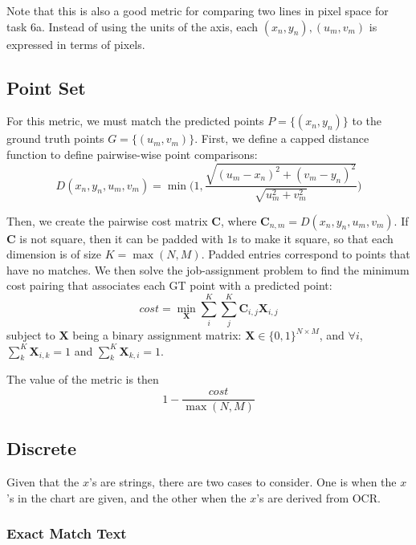 \documentclass[a4paper,11pt]{scrartcl}
\begin{document}
Note that this is also a good metric for comparing two lines in pixel space for task 6a.
Instead of using the units of the axis, each $(x_n, y_n), (u_m, v_m)$ is expressed in terms of pixels.

\subsection{Point Set}

For this metric, we must match the predicted points $P = \{(x_n,y_n)\}$ to the ground truth points $G = \{(u_m, v_m)\}$.
First, we define a capped distance function to define pairwise-wise point comparisons:
\begin{equation}
D(x_n, y_n, u_m, v_m) = \min \Big(1, \frac{\sqrt{(u_m - x_n)^2 + (v_m - y_n)^2}}{\sqrt{u_m^2 + v_m^2}} \Big)
\end{equation}

Then, we create the pairwise cost matrix $\mathbf{C}$, where $\mathbf{C}_{n,m} = D(x_n, y_n, u_m, v_m)$.
If $\mathbf{C}$ is not square, then it can be padded with $1$s to make it square, so that each dimension is of size $K = \max(N,M)$.
Padded entries correspond to points that have no matches.
We then solve the job-assignment problem to find the minimum cost pairing that associates each GT point with a predicted point:
\begin{equation} \label{eq:assign}
cost = \min_{\mathbf{X}} \sum_i^K \sum_j^K \mathbf{C}_{i,j} \mathbf{X}_{i,j}
\end{equation}
subject to $\mathbf{X}$ being a binary assignment matrix: $\mathbf{X} \in \{0,1\}^{N \times M}$, and $\forall i$, $\sum_k^K \mathbf{X}_{i,k} = 1$ and $\sum_k^K \mathbf{X}_{k,i} = 1$.

The value of the metric is then 
\begin{equation} \label{eq:assign_cost}
1 - \frac{cost}{\max(N,M)}
\end{equation}


\subsection{Discrete}

Given that the $x$'s are strings, there are two cases to consider.
One is when the $x$'s in the chart are given, and the other when the $x$'s are derived from OCR.

\subsubsection{Exact Match Text}
\label{sec:discrete_exact}
\end{document}
